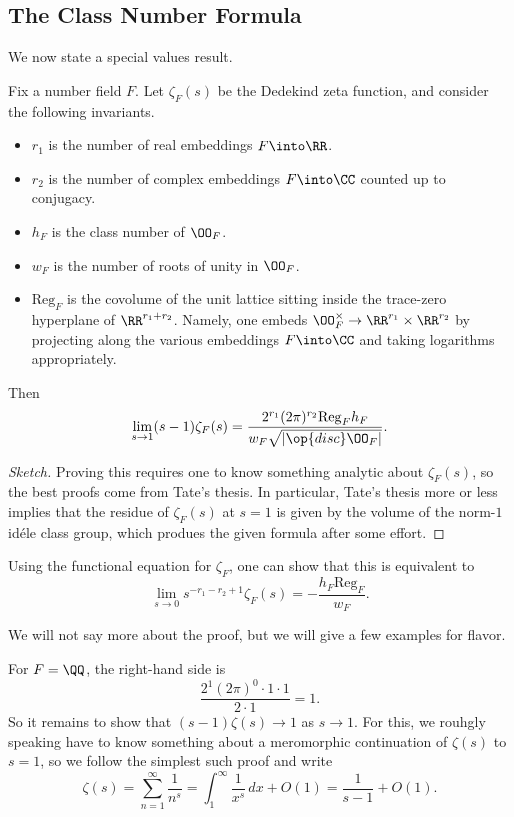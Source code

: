 \documentclass{article}
\begin{document}
\subsection{The Class Number Formula}
We now state a special values result.
\begin{theorem}
	Fix a number field $F$. Let $\zeta_F(s)$ be the Dedekind zeta function, and consider the following invariants.
	\begin{itemize}
		\item $r_1$ is the number of real embeddings $F\into\RR$.
		\item $r_2$ is the number of complex embeddings $F\into\CC$ counted up to conjugacy.
		\item $h_F$ is the class number of $\OO_F$.
		\item $w_F$ is the number of roots of unity in $\OO_F$.
		\item $\mathrm{Reg}_F$ is the covolume of the unit lattice sitting inside the trace-zero hyperplane of $\RR^{r_1+r_2}$. Namely, one embeds $\OO_F^\times\to\RR^{r_1}\times\RR^{r_2}$ by projecting along the various embeddings $F\into\CC$ and taking logarithms appropriately.
	\end{itemize}
	Then
	\[\lim_{s\to 1}(s-1)\zeta_F(s)=\frac{2^{r_1}(2\pi)^{r_2}\mathrm{Reg}_F h_F}{w_F\sqrt{\left|\op{disc}\OO_F\right|}}.\]
\end{theorem}
\begin{proof}[Sketch]
	Proving this requires one to know something analytic about $\zeta_F(s)$, so the best proofs come from Tate's thesis. In particular, Tate's thesis more or less implies that the residue of $\zeta_F(s)$ at $s=1$ is given by the volume of the norm-$1$ id\'ele class group, which produes the given formula after some effort.
\end{proof}
\begin{remark}
	Using the functional equation for $\zeta_F$, one can show that this is equivalent to
	\[\lim_{s\to0}s^{-r_1-r_2+1}\zeta_F(s)=-\frac{h_F\mathrm{Reg}_F}{w_F}.\]
\end{remark}
We will not say more about the proof, but we will give a few examples for flavor.
\begin{example}
	For $F=\QQ$, the right-hand side is
	\[\frac{2^1(2\pi)^0\cdot1\cdot1}{2\cdot1}=1.\]
	So it remains to show that $(s-1)\zeta(s)\to1$ as $s\to1$. For this, we rouhgly speaking have to know something about a meromorphic continuation of $\zeta(s)$ to $s=1$, so we follow the simplest such proof and write
	\[\zeta(s)=\sum_{n=1}^\infty\frac1{n^s}=\int_1^\infty\frac1{x^s}\,dx+O(1)=\frac1{s-1}+O(1).\]
\end{example}
\end{document}
